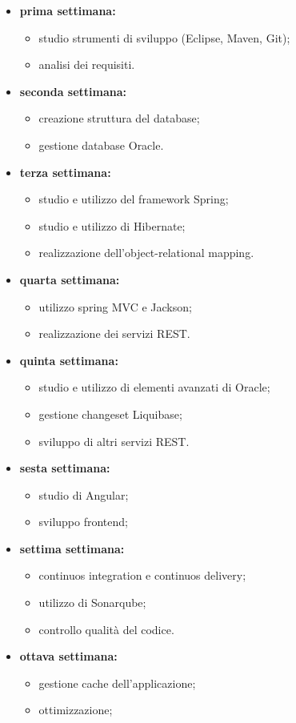 \begin{itemize}
    \item \textbf{prima settimana:}
    \begin{itemize}
        \item studio strumenti di sviluppo (Eclipse, Maven, Git);
        \item analisi dei requisiti.
    \end{itemize}
    \item \textbf{seconda settimana:}
    \begin{itemize}
        \item creazione struttura del database;
        \item gestione database Oracle.
    \end{itemize}
    \item \textbf{terza settimana:}
    \begin{itemize}
        \item studio e utilizzo del framework Spring;
        \item studio e utilizzo di Hibernate;
        \item realizzazione dell'object-relational mapping. 
    \end{itemize}
    \item \textbf{quarta settimana:}
    \begin{itemize}
        \item utilizzo spring MVC e Jackson;
        \item realizzazione dei servizi REST.
    \end{itemize}
    \item \textbf{quinta settimana:}
    \begin{itemize}
        \item studio e utilizzo di elementi avanzati di Oracle;
        \item gestione changeset Liquibase;
        \item sviluppo di altri servizi REST. 
    \end{itemize}
    \item \textbf{sesta settimana:}
    \begin{itemize}
        \item studio di Angular;
        \item sviluppo frontend;
    \end{itemize}
    \item \textbf{settima settimana:}
    \begin{itemize}
        \item continuos integration e continuos delivery;
        \item utilizzo di Sonarqube;
        \item controllo qualità del codice.
    \end{itemize}
    \item \textbf{ottava settimana:}
    \begin{itemize}
        \item gestione cache dell'applicazione;
        \item ottimizzazione;
    \end{itemize}
\end{itemize}

